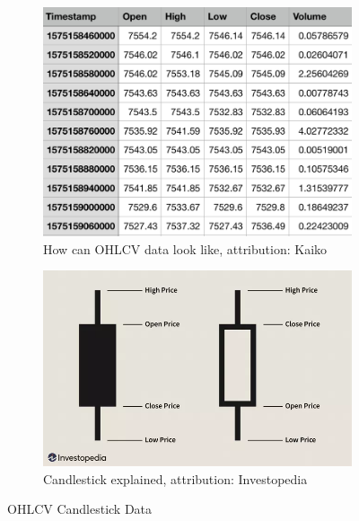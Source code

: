 \begin{figure}
    \centering
    \begin{subfigure}[t]{0.45\textwidth}
        \centering
        \includegraphics[width=\textwidth]{figures/OHLCV-data.png}
        \caption{How can OHLCV data look like, attribution: Kaiko \cite{kaiko-ohlcv}}
        \label{OHLCV-figure}
    \end{subfigure}
    \hfill
    \begin{subfigure}[t]{0.45\textwidth}
        \centering
        \includegraphics[width=\textwidth]{figures/candlestick-data.png}
        \caption{Candlestick explained, attribution: Investopedia \cite{investopedia:candlestick-charts}}
        \label{candlestick-figure}
    \end{subfigure}
    \caption{OHLCV Candlestick Data}
\end{figure}

